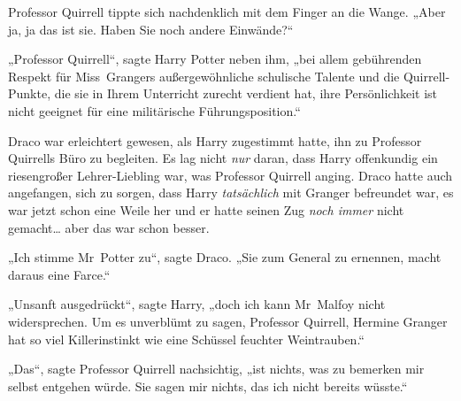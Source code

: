 Professor Quirrell tippte sich nachdenklich mit dem Finger an die Wange. „Aber ja, ja das ist sie. Haben Sie noch andere Einwände?“

„Professor Quirrell“, sagte Harry Potter neben ihm, „bei allem gebührenden Respekt für Miss~Grangers außergewöhnliche schulische Talente und die Quirrell-Punkte, die sie in Ihrem Unterricht zurecht verdient hat, ihre Persönlichkeit ist nicht geeignet für eine militärische Führungsposition.“

Draco war erleichtert gewesen, als Harry zugestimmt hatte, ihn zu Professor Quirrells Büro zu begleiten. Es lag nicht \emph{nur} daran, dass Harry offenkundig ein riesengroßer Lehrer-Liebling war, was Professor Quirrell anging. Draco hatte auch angefangen, sich zu sorgen, dass Harry \emph{tatsächlich} mit Granger befreundet war, es war jetzt schon eine Weile her und er hatte seinen Zug \emph{noch immer} nicht gemacht… aber das war schon besser.

„Ich stimme Mr~Potter zu“, sagte Draco. „Sie zum General zu ernennen, macht daraus eine Farce.“

„Unsanft ausgedrückt“, sagte Harry, „doch ich kann Mr~Malfoy nicht widersprechen. Um es unverblümt zu sagen, Professor Quirrell, Hermine Granger hat so viel Killerinstinkt wie eine Schüssel feuchter Weintrauben.“

„Das“, sagte Professor Quirrell nachsichtig, „ist nichts, was zu bemerken mir selbst entgehen würde. Sie sagen mir nichts, das ich nicht bereits wüsste.“

